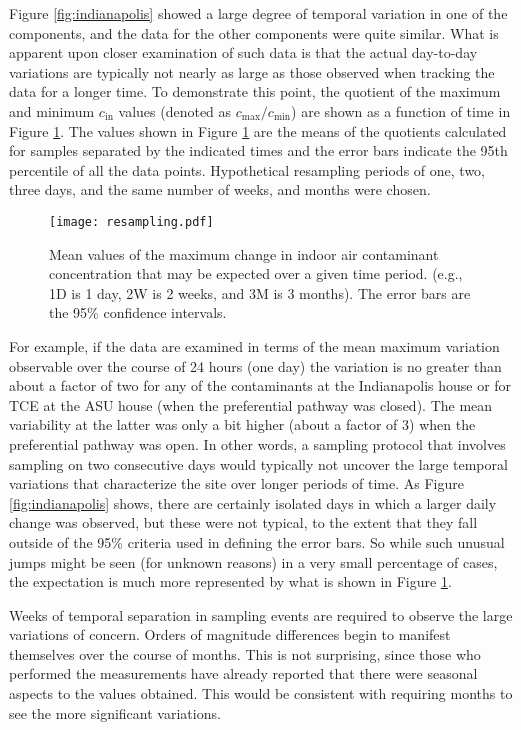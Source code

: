 \documentclass[preprint,12pt]{elsarticle}
\begin{document}
Figure \ref{fig:indianapolis} showed a large degree of temporal variation in one of the components, and the data for the other components were quite similar.
What is apparent upon closer examination of such data is that the actual day-to-day variations are typically not nearly as large as those observed when tracking the data for a longer time.
To demonstrate this point, the quotient of the maximum and minimum $c_\mathrm{in}$ values (denoted as $c_\mathrm{max}/c_\mathrm{min}$) are shown as a function of time in Figure \ref{fig:resampling}.
The values shown in Figure \ref{fig:resampling} are the means of the quotients calculated for samples separated by the indicated times and the error bars indicate the 95th percentile of all the data points.
Hypothetical resampling periods of one, two, three days, and the same number of weeks, and months were chosen.\par

\begin{figure}[htb!]
 \centering
 \texttt{[image: resampling.pdf]}
 \caption{Mean values of the maximum change in indoor air contaminant concentration that may be expected over a given time period. (e.g., 1D is 1 day, 2W is 2 weeks, and 3M is 3 months). The error bars are the 95\% confidence intervals.}\label{fig:resampling}
\end{figure}

For example, if the data are examined in terms of the mean maximum variation observable over the course of 24 hours (one day) the variation is no greater than about a factor of two for any of the contaminants at the Indianapolis house or for TCE at the ASU house (when the preferential pathway was closed).
The mean variability at the latter was only a bit higher (about a factor of 3) when the preferential pathway was open.
In other words, a sampling protocol that involves sampling on two consecutive days would typically not uncover the large temporal variations that characterize the site over longer periods of time.
As Figure \ref{fig:indianapolis} shows, there are certainly isolated days in which a larger daily change was observed, but these were not typical, to the extent that they fall outside of the 95\% criteria used in defining the error bars.
So while such unusual jumps might be seen (for unknown reasons) in a very small percentage of cases, the expectation is much more represented by what is shown in Figure \ref{fig:resampling}.\par

Weeks of temporal separation in sampling events are required to observe the large variations of concern.
Orders of magnitude differences begin to manifest themselves over the course of months.
This is not surprising, since those who performed the measurements have already reported that there were seasonal aspects to the values obtained.
This would be consistent with requiring months to see the more significant variations.\par
\end{document}
